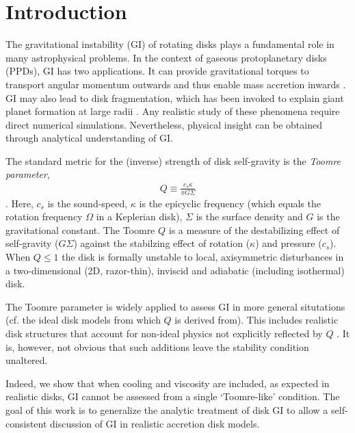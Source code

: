 \documentclass[iop, numberedappendix]{emulateapj}
\begin{document}
\section{Introduction}\label{intro} 
The gravitational instability (GI) of rotating disks    
plays a fundamental role in many astrophysical problems. In the context of 
gaseous protoplanetary disks (PPDs), GI has two applications. It can  
provide gravitational torques to transport angular momentum outwards
and thus enable mass accretion inwards \citep{armitage10,turner14}.   
GI may also lead to disk fragmentation, which has been invoked to 
explain giant planet formation at large radii \citep{helled14}. Any 
realistic study of these phenomena require direct   
numerical simulations. Nevertheless, physical insight can be  
obtained through analytical understanding of GI.  %

The standard metric for the (inverse) strength of disk self-gravity is the 
\emph{Toomre parameter}, 
\begin{align}\label{toomreQ_criterion}
  Q \equiv \frac{c_s\kappa}{\pi G \Sigma}  
\end{align}
\citep{toomre64}. Here, $c_s$ is the sound-speed,
$\kappa$ is the epicyclic frequency (which equals the rotation
frequency $\Omega$ in a Keplerian disk), $\Sigma$ is the surface
density and $G$ is the gravitational constant. The Toomre $Q$ is a
measure of the destabilizing effect of self-gravity ($G\Sigma$) against 
the stabilzing effect of rotation ($\kappa$) and pressure 
($c_s$). When $Q\leq 1$ the disk is formally unstable to local,
axisymmetric disturbances in a two-dimensional (2D, razor-thin),
inviscid and adiabatic (including isothermal) disk.  


The Toomre parameter is widely applied to assess GI in more general 
situtations (cf. the ideal disk models from which $Q$ is derived
from). This includes realistic disk structures 
that account for non-ideal physics not 
explicitly reflected by $Q$ \citep[e.g.][]{kimura12}.  It is, however,
not obvious that such additions leave the stability condition
unaltered. 

Indeed, we show that when cooling and viscosity are  
included, as expected in realistic disks, GI cannot be assessed from a
single `Toomre-like' condition.      
The goal of this work is to generalize the analytic treatment of disk 
GI to allow a self-consistent discussion of GI in realistic accretion 
disk models. 
\end{document}
